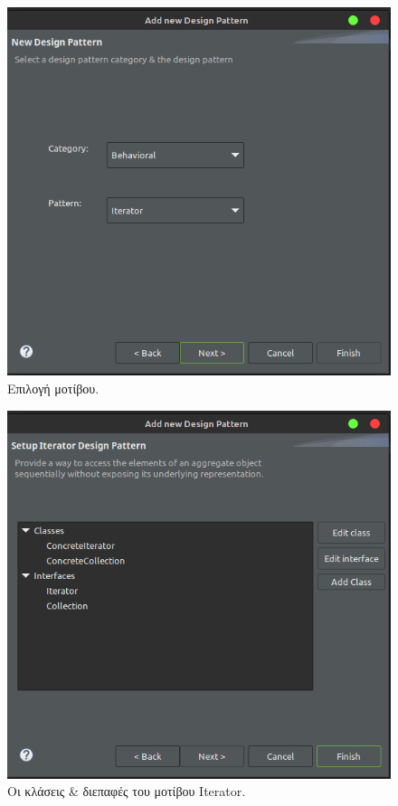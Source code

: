 \begin{figure}[H]
    \centering
    \includegraphics[width=1.0\textwidth]{Figures/select_pattern1.png}
    \caption{Επιλογή μοτίβου.}
    \label{fig:select_pattern1}
\end{figure}
\begin{figure}[H]
    \centering
    \includegraphics[width=1.0\textwidth]{Figures/classes_interfaces.png}
    \caption{Οι κλάσεις \& διεπαφές του μοτίβου Iterator.}
    \label{fig:classes_interfaces}
\end{figure}
